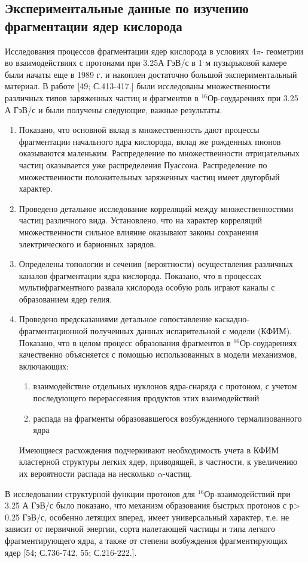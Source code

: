 \documentclass[fontsize=14pt]{scrarticle}
\begin{document}
\subsection{Экспериментальные данные по изучению фрагментации ядер
кислорода}
\hspace{0.6cm}
Исследования процессов фрагментации ядер кислорода в условиях 4$\pi$-
геометрии во взаимодействиях с протонами при 3.25А ГэВ/с в 1 м
пузырьковой камере были начаты еще в 1989 г. и накоплен достаточно
большой экспериментальный материал.
В работе [49; С.413-417.] были исследованы множественности
различных типов заряженных частиц и фрагментов в
$^{16}$Ор-соударениях при 3.25 А ГэВ/с и были получены следующие, важные результаты.
\begin{enumerate}
    \item Показано, что основной вклад в множественность дают процессы фрагментации начального ядра кислорода, вклад же рожденных пионов оказываются маленьким. Распределение по множественности отрицательных частиц оказывается уже распределения Пуассона. Распределение по множественности положительных заряженных частиц имеет двугорбый характер.
    \item Проведено детальное исследование корреляций между множественностями частиц различного вида. Установлено, что на характер корреляций множественности сильное влияние оказывают законы сохранения электрического и барионных зарядов.
    \item Определены топологии и сечения (вероятности) осуществления различных каналов фрагментации ядра кислорода. Показано, что в процессах мультифрагментного развала кислорода особую роль играют каналы с образованием ядер гелия.
    \item Проведено предсказаниями детальное сопоставление каскадно-фрагментационной полученных данных испарительной с модели (КФИМ). Показано, что в целом процесс образования фрагментов в $^{16}$Ор-соударениях качественно объясняется с помощью использованных в модели механизмов, включающих: 
    \begin{enumerate}
        \item взаимодействие отдельных нуклонов ядра-снаряда с протоном, с учетом последующего перерассеяния продуктов этих взаимодействий
        \item распада на фрагменты образовавшегося возбужденного термализованного ядра
    \end{enumerate}
    Имеющиеся расхождения подчеркивают необходимость учета в КФИМ кластерной структуры легких ядер, приводящей, в частности, к увеличению их вероятности распада на несколько $\alpha$-частиц.
\end{enumerate}
В исследовании структурной функции протонов для $^{16}$Ор-взаимодействий при 3.25 А ГэВ/с было показано, что механизм образования быстрых протонов с р> 0.25 ГэВ/с, особенно летящих вперед, имеет универсальный характер, т.е. не зависит от первичной
энергии, сорта налетающей частицы и типа легкого фрагментирующего ядра, а также от степени возбуждения фрагментирующих ядер [54; С.736-742. 55; С.216-222.].
\end{document}
